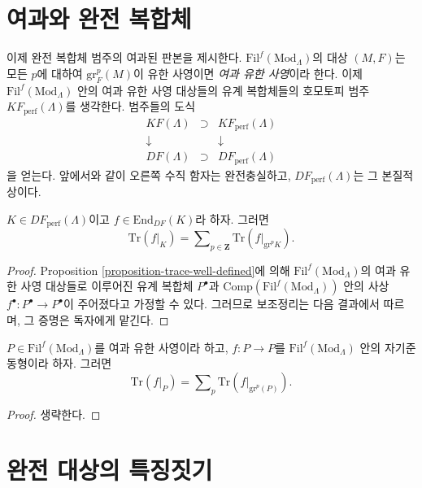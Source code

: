 \section{여과와 완전 복합체}
\label{section-filtrations-perfect}

\noindent
이제 완전 복합체 범주의 여과된 판본을 제시한다.
$\text{Fil}^f(\text{Mod}_\Lambda)$의 대상 $(M, F)$는 모든 $p$에 대하여
$\text{gr}^p_F (M)$이 유한 사영이면 {\it 여과 유한 사영}이라 한다.
이제 $\text{Fil}^f(\text{Mod}_\Lambda)$ 안의 여과 유한 사영 대상들의
유계 복합체들의 호모토피 범주 $KF_{\text{perf}}(\Lambda)$를 생각한다.
범주들의 도식
$$
\begin{matrix}
KF(\Lambda) & \supset & KF_{\text{perf}}(\Lambda)\\
\downarrow & & \downarrow\\
DF(\Lambda) & \supset & DF_{\text{perf}}(\Lambda)
\end{matrix}
$$
을 얻는다. 앞에서와 같이 오른쪽 수직 함자는 완전충실하고,
$DF_{\text{perf}}(\Lambda)$는 그 본질적 상이다.

\begin{lemma}[가법성]
\label{lemma-additivity}
$K\in DF_{\text{perf}}(\Lambda)$이고 $f\in \text{End}_{DF}(K)$라 하자.
그러면
$$
\text{Tr}(f|_K) =
\sum\nolimits_{p\in \mathbf{Z}} \text{Tr}(f|_{\text{gr}^p K}).
$$
\end{lemma}

\begin{proof}
Proposition \ref{proposition-trace-well-defined}에 의해
$\text{Fil}^f(\text{Mod}_\Lambda)$의 여과 유한 사영 대상들로 이루어진
유계 복합체 $P^\bullet$과
$\text{Comp}(\text{Fil}^f(\text{Mod}_\Lambda))$ 안의 사상
$f^\bullet : P^\bullet\to P^\bullet$이 주어졌다고 가정할 수 있다.
그러므로 보조정리는 다음 결과에서 따르며, 그 증명은 독자에게 맡긴다.
\end{proof}

\begin{lemma}
\label{lemma-additive-filtered-finite-projective}
$P \in \text{Fil}^f(\text{Mod}_\Lambda)$를 여과 유한 사영이라 하고,
$f : P \to P$를 $\text{Fil}^f(\text{Mod}_\Lambda)$ 안의 자기준동형이라
하자. 그러면
$$
\text{Tr}(f|_P) =
\sum\nolimits_p \text{Tr}(f|_{\text{gr}^p(P)}).
$$
\end{lemma}

\begin{proof}
생략한다.
\end{proof}


\section{완전 대상의 특징짓기}
\label{section-characterizing-perfect}

